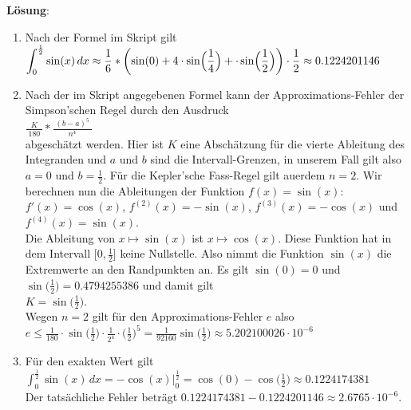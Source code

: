 \documentclass{article}
\newcommand{\bruch}[2]{\displaystyle\frac{\;\displaystyle#1\;}{\;\displaystyle#2\;}}
\begin{document}
\noindent
\textbf{L\"osung}:  
\begin{enumerate}
\item Nach der Formel im Skript gilt
      \\[0.3cm]
      \hspace*{1.3cm}
     $\displaystyle \int_0^{\frac{1}2} \sin(x)\, dx  \approx \frac{1}{6}*\biggl( \sin(0) + 4\cdot \sin\Bigl(\frac{1}{4}\Bigr) + \cdot
        \sin\Bigl(\frac{1}{2}\Bigr) \biggr)\cdot \frac{1}{2}
        \approx 0.1224201146
       $ 
\item Nach der im Skript angegebenen Formel kann der Approximations-Fehler
      der Simpson'schen Regel durch den Ausdruck
      \\[0.3cm]
      \hspace*{1.3cm}
      $\bruch{K}{180} * \bruch{(b-a)^5}{n^4}$
      \\[0.3cm]
      abgesch\"atzt werden.  Hier ist $K$  eine Absch\"atzung f\"ur die vierte Ableitung des
      Integranden und $a$ und $b$ sind die Intervall-Grenzen, in unserem Fall gilt also
      $a=0$ und $b=\frac{1}{2}$.  F\"ur die Kepler'sche Fass-Regel gilt au\3erdem $n=2$.
      Wir berechnen nun die Ableitungen der Funktion $f(x) = \sin(x)$: 
      \\[0.3cm]
      \hspace*{1.3cm}
      $f'(x) = \cos(x)$, $f^{(2)}(x) = -\sin(x)$, $f^{(3)}(x) = -\cos(x)$ und $f^{(4)}(x) = \sin(x)$.
      \\[0.3cm]
      Die Ableitung von $x \mapsto \sin(x)$ ist $x \mapsto \cos(x)$.  Diese Funktion
      hat in dem  Intervall $\bigl[0, \frac{1}{2}\bigr]$ keine Nullstelle. Also nimmt die Funktion
      $\sin(x)$ die Extremwerte an den Randpunkten an.  Es gilt $\sin(0) = 0$ und
      $\sin\bigl(\frac{1}{2}\bigr) = 0.4794255386$ und damit gilt 
      \\[0.3cm]
      \hspace*{1.3cm}
      $K = \sin\bigl(\frac{1}{2}\bigr)$.
      \\[0.3cm]
      Wegen $n=2$ gilt f\"ur den Approximations-Fehler $e$ also
      \\[0.1cm]
      \hspace*{1.3cm}
      $e \leq \frac{1}{180}\cdot \sin\bigl(\frac{1}{2}\bigr)\cdot \frac{1}{2^4} \cdot \bigl(\frac{1}{2}\bigr)^5 = \frac{1}{92160} \sin\bigl(\frac{1}{2}\bigr) 
       \approx 5.202100026 \cdot 10^{-6}$
\item F\"ur den exakten Wert gilt
      \\[0.3cm]
      \hspace*{1.3cm}
      $\displaystyle \int_0^{\frac{1}2} \sin(x)\, dx = -\cos(x) \bigg|_0^{\frac{1}{2}} = \cos(0) - \cos\bigl(\frac{1}{2}\bigr) \approx 0.1224174381$
      \\[0.3cm]
      Der tats\"achliche Fehler betr\"agt $0.1224174381 - 0.1224201146 \approx 2.6765\cdot 10^{-6}$.
\end{enumerate}
\pagebreak
\end{document}
